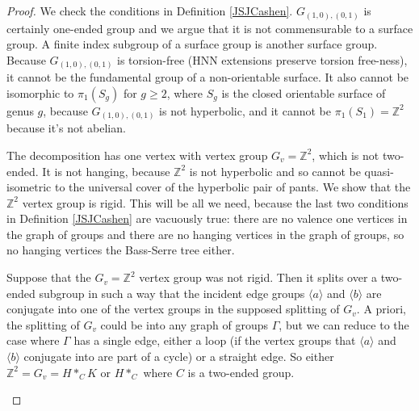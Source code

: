 \documentclass[10pt]{article}
\def\integers{{\mathbb{Z}}}
\theoremstyle{definition}
\begin{document}
\begin{proof}
We check the conditions in Definition \ref{JSJCashen}. $G_{(1,0),(0,1)}$ is certainly one-ended group and we argue that it is not commensurable to a surface group. A finite index subgroup of a surface group is another surface group. Because $G_{(1,0),(0,1)}$ is torsion-free (HNN extensions preserve torsion free-ness), it cannot be the fundamental group of a non-orientable surface. It also cannot be isomorphic to $\pi_1(S_g)$ for $g\geq 2$, where $S_g$ is the closed orientable surface of genus $g$, because $G_{(1,0),(0,1)}$ is not hyperbolic, and it cannot be $\pi_1(S_1) = \integers^2$ because it's not abelian. 

The decomposition has one vertex with vertex group $G_v = \integers^2$, which is not two-ended. It is not hanging, because $\integers^2$ is not hyperbolic and so cannot be quasi-isometric to the universal cover of the hyperbolic pair of pants. We show that the $\integers^2$ vertex group is rigid. This will be all we need, because the last two conditions in Definition \ref{JSJCashen} are vacuously true: there are no valence one vertices in the graph of groups and there are no hanging vertices in the graph of groups, so no hanging vertices the Bass-Serre tree either. 

Suppose that the $G_v = \integers^2$ vertex group was not rigid. Then it splits over a two-ended subgroup  in such a way that the incident edge groups $\langle a\rangle$ and $\langle b \rangle$ are conjugate into one of the vertex groups in the supposed splitting of $G_v$. A priori, the splitting of $G_v$ could be into any graph of groups $\Gamma$, but we can reduce to the case where $\Gamma$ has a single edge, either a loop (if the vertex groups that $\langle a \rangle$ and $\langle b \rangle$ conjugate into are part of a cycle) or a straight edge. So either $\integers^2 = G_v = H *_C K$ or $H *_C$ where $C$ is a two-ended group. 

\begin{center}
\end{center}
\end{proof}
\end{document}
